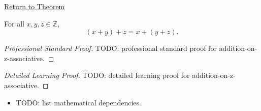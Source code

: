\newpage
{}
\label{prf:addition-on-z-associative}

\begin{remark*}[Return]
\hyperref[thm:addition-on-z-associative]{Return to Theorem}
\end{remark*}

\begin{theorem*}
For all $x,y,z\in\mathbb{Z}$,
\[
(x+y)+z=x+(y+z).
\]
\end{theorem*}

\begin{proof}[Professional Standard Proof]
\LRAProofBodyStart
TODO: professional standard proof for addition-on-z-associative.
\end{proof}

\begin{proof}[Detailed Learning Proof]
\LRAProofBodyStart
TODO: detailed learning proof for addition-on-z-associative.
\end{proof}

\begin{remark*}
\end{remark*}

\begin{dependencies}
\begin{itemize}
  \item TODO: list mathematical dependencies.
\end{itemize}
\end{dependencies}

\clearpage
